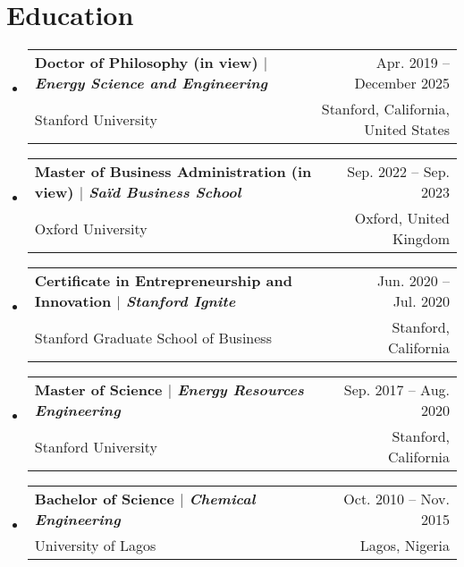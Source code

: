 \documentclass[A4, 11pt]{article}
\makeatletter
\newcommand{\CVSubheading}[4]{
  \vspace{-2pt}\item
    \begin{tabular*}{0.97\textwidth}[t]{l@{\extracolsep{\fill}}r}
      \textbf{#1} & #2 \\
      \small#3 & \small #4 \\
    \end{tabular*}\vspace{-7pt}
}
\newcommand{\CVSubHeadingListStart}{\begin{itemize}[leftmargin=0.5cm, label={}]}
\newcommand{\CVSubHeadingListEnd}{\end{itemize}}
\makeatother
\begin{document}
\begin{comment}
This CV was written for specifically for positions I was applying for in
academia, and then modified to be a template.

A standard CV is about two pages long where as a resume in the US is one page.
sections can be added and removed here with this in mind. In my experience, 
education, and applicable work experience and skills are the most import things
to include on a resume. For a CV the Europass CV suggests the categories: Work
Experience, Education and Training, Language Skills, Digital Skills,
Communication and Interpersonal Skills, Conferences and Seminars, Creative Works
Driver's License, Hobbies and Interests, Honors and Awards, Management and
Leadership Skills, Networks and Memberships, Organizational Skills, Projects,
Publications, Recommendations, Social and Political Activities, Volunteering.

Your goal is to convey a who, what , when, where, why for every item you share. 
The who is obviously you, but I believe the rest should be done in that order.
For example below. An employer cares most about the degree held and typically 
less about the institution or where it is located (This is still good 
information though). Whatever order you choose be consistent throughout.
\end{comment}

\section{Education}
  \CVSubHeadingListStart
    \CVSubheading
      {{Doctor of Philosophy (in view) $|$ \emph{\small{Energy Science and Engineering}}}}{Apr. 2019 -- December 2025 }
      {Stanford University}{Stanford, California, United States}
    \CVSubheading
      {{Master of Business Administration (in view) $|$ \emph{\small{Sa\"id Business School}}}}{Sep. 2022 -- Sep. 2023}
      {Oxford University}{Oxford, United Kingdom}
    \CVSubheading
      {{Certificate in Entrepreneurship and Innovation $|$ \emph{\small{Stanford Ignite}}}}{Jun. 2020 -- Jul. 2020}
      {Stanford Graduate School of Business}{Stanford, California}
    \CVSubheading
      {{Master of Science $|$ \emph{\small{Energy Resources Engineering}}}}{Sep. 2017 -- Aug. 2020}
      {Stanford University}{Stanford, California}
    \CVSubheading
      {{Bachelor of Science $|$ \emph{\small{Chemical Engineering}}}}{Oct. 2010 -- Nov. 2015}
      {University of Lagos}{Lagos, Nigeria}
  \CVSubHeadingListEnd
\end{document}
